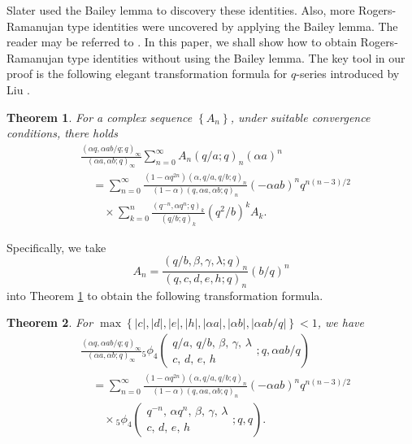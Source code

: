 \documentclass[reqno,12pt]{amsart}
\newtheorem{theorem}{Theorem}[section]%
\theoremstyle{remark}
\numberwithin{equation}{section}
\begin{document}
Slater used the Bailey lemma to  discovery these identities. Also, more Rogers-Ramanujan type identities  were uncovered by applying the Bailey lemma. The reader may be referred to \cite{Andrews2,Bowman,McLaughlin-2008, McLaughlin_2008}.   In this paper,  we shall show how to obtain Rogers-Ramanujan type identities  without using the Bailey lemma. 
The key tool in our proof is the following elegant transformation formula for $q$-series introduced by Liu \cite{Liu2}.
 \begin{theorem}\label{theorem1}
 For a complex sequence $\left\{A_n\right\}$, under suitable convergence conditions, there holds
 \begin{align}
 &\frac{\left(\alpha q,\alpha ab/q;q\right)_{\infty}}
 {\left(\alpha a,\alpha b;q\right)_{\infty}}
 \sum_{n=0}^{\infty}A_n\left(q/a;q\right)_n\left(\alpha a\right)^n\nonumber\\
 &\quad=\sum_{n=0}^{\infty}
 \frac{\left(1-\alpha q^{2n}\right)\left(\alpha,q/a,q/b;q\right)_n}{\left(1-\alpha\right)\left(q,\alpha a,\alpha b;q\right)_n}\left(-\alpha ab\right)^nq^{n(n-3)/2}\nonumber\\
 &\qquad\times\sum_{k=0}^{n}\frac{\left(q^{-n},\alpha q^n;q\right)_k}{\left(q/b;q\right)_k}\left(q^2/b\right)^kA_k.
 \label{Formula3}
  \end{align}
 \end{theorem}
Specifically,
we take
\begin{equation*}
A_n=\frac{\left(q/b,\beta,\gamma,\lambda;q\right)_n}
{\left(q, c, d,e,h;q\right)_n}\left(b/q\right)^n
\end{equation*}
into Theorem \ref{theorem1} to obtain the following  transformation formula.
\begin{theorem}\label{thm1}
For $\max\left\{|c|,|d|,|e|,|h|,|\alpha a|,|\alpha b|,|\alpha ab/q| \right\}<1$, we have
\begin{align}
&\frac{\left(\alpha q,\alpha ab/q;q\right)_{\infty}}{\left(\alpha a,\alpha b;q\right)_{\infty}}
{_5\phi_4}\left(\begin{array}{ccccc}
q/a,\,q/b,\,\beta,\,\gamma,\,\lambda\\
c,\,d,\,e,\,h
\end{array}
;q,{\alpha ab}/{q}\right)\nonumber\\
&\quad=
\sum_{n=0}^{\infty}
\frac{\left(1-\alpha q^{2n}\right)\left(\alpha,q/a,q/b;q\right)_n}
{\left(1-\alpha\right)\left(q,\alpha a,\alpha b;q\right)_n}\left(-\alpha ab\right)^nq^{n\left(n-3\right)/2}\nonumber\\
&\qquad\times{_5\phi_4}\left(\begin{array}{ccccc}
q^{-n},\,\alpha q^n,\,\beta,\,\gamma,\,\lambda\\
c,\,d,\,e,\,h
\end{array}
;q,q\right).\label{Formula4}
\end{align}
\end{theorem}
\end{document}
